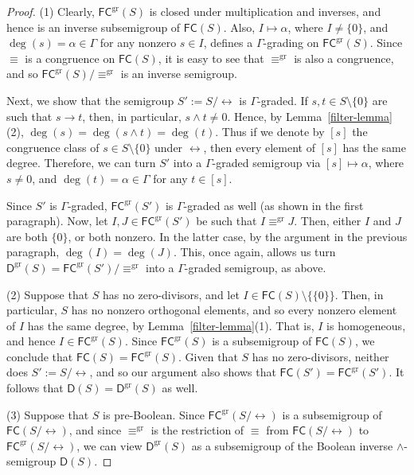 \documentclass[a4paper,reqno,12pt]{amsart}
\numberwithin{equation}{section}
\theoremstyle{plain}
\theoremstyle{definition}
\newcommand{\gr}{\operatorname{gr}}
\begin{document}
\begin{proof}
(1) Clearly, $\mathsf{FC}^{\gr}(S)$ is closed under multiplication and inverses, and hence is an inverse subsemigroup of $\mathsf{FC}(S)$. Also, $I \mapsto \alpha$, where $I \neq \{0\}$, and $\deg(s) = \alpha \in \Gamma$ for any nonzero $s \in I$, defines a $\Gamma$-grading on $\mathsf{FC}^{\gr}(S)$. Since $\equiv$ is a congruence on $\mathsf{FC}(S)$, it is easy to see that $\equiv^{\gr}$ is also a congruence, and so $\mathsf{FC}^{\gr}(S)/\equiv^{\gr}$ is an inverse semigroup.

Next, we show that the semigroup $S' := S/\leftrightarrow$ is $\Gamma$-graded. If $s,t \in S \setminus \{0\}$ are such that $s \to t$, then, in particular, $s \land t \neq 0$.  Hence, by Lemma~\ref{filter-lemma}(2), $\deg(s) = \deg(s\land t) = \deg(t)$. Thus if we denote by $[s]$ the congruence class of $s \in S\setminus \{0\}$ under $\leftrightarrow$, then every element of $[s]$ has the same degree. Therefore, we can turn $S'$ into a $\Gamma$-graded semigroup via $[s] \mapsto \alpha$, where $s \neq 0$, and $\deg(t) = \alpha \in \Gamma$ for any $t \in [s]$.

Since $S'$ is $\Gamma$-graded, $\mathsf{FC}^{\gr}(S')$ is $\Gamma$-graded as well (as shown in the first paragraph). Now, let $I,J \in \mathsf{FC}^{\gr}(S')$ be such that $I \equiv^{\gr} J$. Then, either $I$ and $J$ are both $\{0\}$, or both nonzero. In the latter case, by the argument in the previous paragraph, $\deg(I) = \deg(J)$. This, once again, allows us turn $\mathsf{D}^{\gr}(S) = \mathsf{FC}^{\gr}(S')/\equiv^{\gr}$ into a $\Gamma$-graded semigroup, as above.

\smallskip 

(2) Suppose that $S$ has no zero-divisors, and let $I \in \mathsf{FC}(S) \setminus \{\{0\}\}$. Then, in particular, $S$ has no nonzero orthogonal elements, and so every nonzero element of $I$ has the same degree, by Lemma~\ref{filter-lemma}(1). That is, $I$ is homogeneous, and hence $I \in \mathsf{FC}^{\gr}(S)$. Since $\mathsf{FC}^{\gr}(S)$ is a subsemigroup of $\mathsf{FC}(S)$, we conclude that $\mathsf{FC}(S) = \mathsf{FC}^{\gr}(S)$. Given that $S$ has no zero-divisors, neither does $S' := S/\leftrightarrow$, and so our argument also shows that $\mathsf{FC}(S') = \mathsf{FC}^{\gr}(S')$. It follows that $\mathsf{D}(S) = \mathsf{D}^{\gr}(S)$ as well.

\smallskip 

(3) Suppose that $S$ is pre-Boolean. Since $\mathsf{FC}^{\gr}(S/\leftrightarrow)$ is a subsemigroup of $\mathsf{FC}(S/\leftrightarrow)$, and since $\equiv^{\gr}$ is the restriction of $\equiv$ from $\mathsf{FC}(S/\leftrightarrow)$ to $\mathsf{FC}^{\gr}(S/\leftrightarrow)$, we can view $\mathsf{D}^{\gr}(S)$ as a subsemigroup of the Boolean inverse $\land$-semigroup $\mathsf{D}(S)$.


\end{proof}
\end{document}
